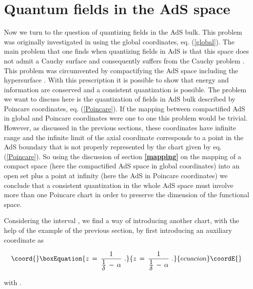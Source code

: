 \documentclass[a4paper,12pt]{article}
\begin{document}
\section{Quantum fields in the AdS space}

\bigskip
 
Now we turn to the question of quantizing fields in the AdS bulk.
This problem was originally investigated in \cite{QAdS1,QAdS2}
using the global coordinates, eq. (\ref{global}).
The main problem that one finds when quantizing fields in AdS is that
this space does not admit a Cauchy surface and consequently suffers from
the Cauchy problem \cite{HE}. This problem  was  circumvented by
compactifying the AdS space including the hypersurface \coordHE{}.
With this prescription it is possible to show that energy and information
are conserved and a consistent quantization is possible.
The problem we want to discuss here is the quantization of fields in AdS
bulk described by Poincare coordinates, eq. (\ref{Poincare}).
If the mapping between compactified AdS in global and Poincare coordinates
were one to one this problem would be trivial. However, as discussed in
the previous sections, these coordinates have infinite
range and  the infinite limit of the axial coordinate 
\coordHE{} corresponds to a point in the AdS boundary that is not 
properly represented by the chart given by eq. (\ref{Poincare}). 
So using the discussion of section {\bf \ref{mapping}} on the mapping 
of a compact
space (here the compactified AdS space in global coordinates) 
into an open set plus a point
at infinity (here the AdS in Poincare coordinates) we conclude that 
a consistent quantization in the whole 
AdS space must involve more than one Poincare chart in order to preserve
the dimension of the functional space. 

Considering the interval \coordHE{}, 
we find a way of introducing another chart, with the help of 
the example of the previous section, by first introducing an auxiliary 
coordinate \myHighlight{$\,\alpha \,$}\coordHE{} as

\begin{equation}\coord{}\boxEquation{
\label{z}
z \,=\, {1\over {\textstyle 1\over\textstyle\delta} \,-\,\alpha}\,\,.
}{
z \,=\, {1\over {\textstyle 1\over\textstyle\delta} \,-\,\alpha}\,\,.
}{ecuacion}\coordE{}\end{equation}

\noindent with \coordHE{}. 
\end{document}
